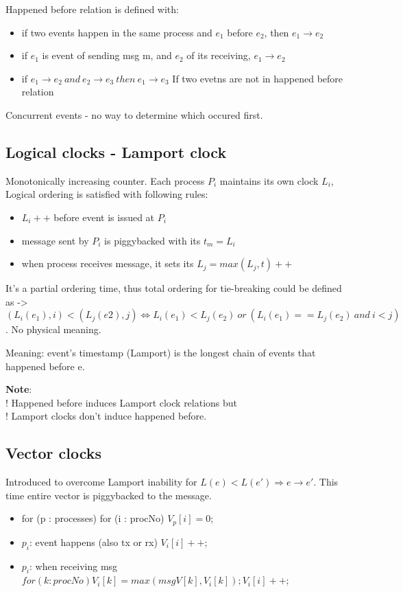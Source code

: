 \documentclass[10pt,a4paper]{article}
\begin{document}
Happened before relation is defined with:
\begin{itemize}
	\item if two events happen in the same process and $e_1$ before $e_2$, then $e_1 \rightarrow e_2$
	\item if $e_1$ is event of sending msg m, and $e_2$ of its receiving, $e_1 \rightarrow e_2$
	\item if $e_1 \rightarrow e_2 \ and \ e_2 \rightarrow e_3 \ then \ e_1 \rightarrow e_3$
If two evetns are not in happened before relation 
\end{itemize}
Concurrent events - no way to determine which occured first. 
\subsection {Logical clocks - Lamport clock}
Monotonically increasing counter. Each process $P_i$ maintains its own clock $L_i$, Logical ordering is satisfied with following rules:
\begin{itemize}
	\item $L_i++$ before event is issued at $P_i$
	\item message sent by $P_i$ is piggybacked with its $t_m = L_i$
	\item when process receives message, it sets its $L_j=max(L_j, t)++$
\end{itemize}

It's a partial ordering time, thus total ordering for tie-breaking could be defined as -> $(L_i(e_1), i) < (L_j(e2), j) \Leftrightarrow L_i(e_1) < L_j(e_2) \ or \ (L_i(e_1)==L_j(e_2) \ and \ i<j)$. No physical meaning.

Meaning: event's timestamp (Lamport) is the longest chain of events that happened before e.

\textbf{Note}:\\
! Happened before induces Lamport clock relations but\\
! Lamport clocks don't induce happened before.

\subsection{Vector clocks}
Introduced to overcome Lamport inability for $L(e) < L(e') \Rightarrow e \rightarrow e'$. This time entire vector is piggybacked to the message. 
\begin{itemize}
	\item for (p : processes) for (i : procNo) $V_p[i]=0$;
	\item $p_i$: event happens (also tx or rx) $V_i[i]++$;
	\item $p_i$: when receiving msg $for (k : procNo) V_i[k] = max(msgV[k], V_i[k]); V_i[i]++$;
\end{itemize}
\end{document}
